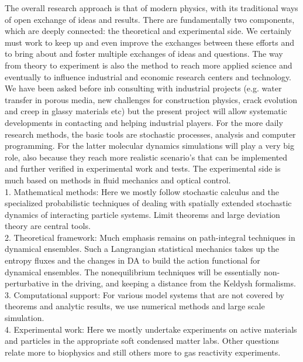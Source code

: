 The overall research approach is that of modern physics, with its traditional ways of open exchange of ideas and results.  There are fundamentally two components, which are deeply connected: the theoretical and experimental side.
We certainly must work to keep up and even improve the exchanges between these efforts and to bring about and foster multiple exchanges of ideas and questions.  The way from theory to experiment is also the method to reach more applied science and eventually to influence industrial and economic research centers and technology.  We have been asked before inb consulting with industrial projects (e.g. water transfer in porous media, new challenges for construction physics, crack evolution and creep in glassy materials etc) but the present project will allow systematic developments in contacting and helping industrial players.
For the more daily research methods, the basic tools are stochastic processes, analysis and computer programming.  For the latter molecular dynamics simulations will play a very big role, also because they reach more realistic scenario's that can be implemented and further verified in experimental work and tests.  The experimental side is much based on methods in fluid mechanics and optical control.\\

1. Mathematical methods: Here we mostly follow stochastic calculus and the specialized probabilistic techniques of dealing with spatially extended stochastic dynamics of interacting particle systems. Limit theorems and large deviation theory are central tools.\\
2. Theoretical framework:  Much emphasis remains on path-integral techniques in dynamical ensembles.  Such a Langrangian statistical mechanics takes up the entropy fluxes and the changes in DA to build the action functional for dynamical ensembles.  The nonequilibrium techniques will be essentially non-perturbative in the driving, and keeping a distance from the Keldysh formalisms.\\
3. Computational support: For various model systems that are not covered by theorems and analytic results, we use numerical methods and large scale simulation.\\
4. Experimental work: Here we mostly undertake experiments on active materials and particles in the appropriate soft condensed matter labs.  Other questions relate more to biophysics and still others more to gas reactivity experiments.





